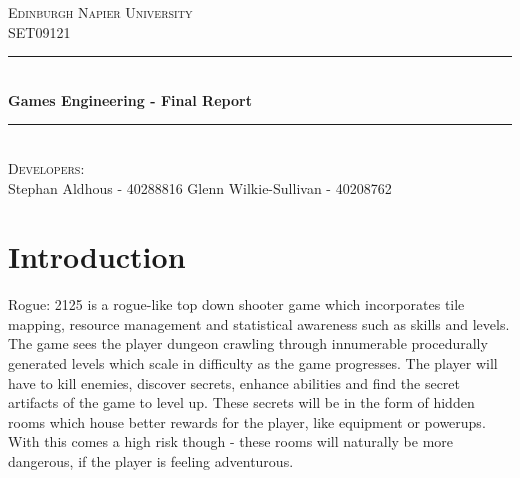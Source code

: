 \documentclass[12pt]{article}
\begin{document}
\begin{titlepage}

\newcommand{\HRule}{\rule{\linewidth}{0.5mm}} %

\center %
 

\textsc{\LARGE Edinburgh Napier University}\\[1.5cm] %
\textsc{\large SET09121}\\[0.5cm] %


\HRule \\[0.4cm]
{ \huge \bfseries Games Engineering - Final Report}\\[0.4cm] %
\HRule \\[1.5cm]
 

\vfill %
\textsc{Developers:}\\[0.5cm]
Stephan Aldhous - 40288816
\linebreak
Glenn Wilkie-Sullivan - 40208762
\linebreak

\end{titlepage}

\section{Introduction}

Rogue: 2125 is a rogue-like top down shooter game which incorporates tile mapping, resource management and statistical awareness such as skills and levels. The game sees the player dungeon crawling through innumerable procedurally generated levels which scale in difficulty as the game progresses. The player will have to kill enemies, discover secrets, enhance abilities and find the secret artifacts of the game to level up. These secrets will be in the form of hidden rooms which house better rewards for the player, like equipment or powerups. With this comes a high risk though - these rooms will naturally be more dangerous, if the player is feeling adventurous. \linebreak
\end{document}
